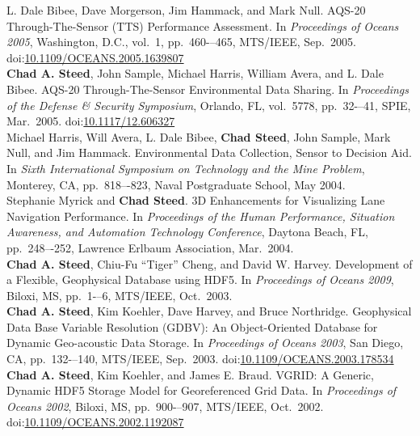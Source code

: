 \documentclass[11pt, letterpaper]{article}
\newcommand{\amper}{{\fontspec[Scale=.95]{Hoefler Text}\selectfont\itshape\&}}
\newcommand{\years}[1]{\marginnote{\scriptsize #1}}
\begin{document}
\begin{sloppypar}
L. Dale Bibee, Dave Morgerson, Jim Hammack, and Mark Null.  AQS-20
Through-The-Sensor (TTS) Performance Assessment.  In \emph{Proceedings of
Oceans 2005}, Washington, D.C., vol.\ 1, pp.\ 460-–465, MTS/IEEE, Sep.\ 2005.
doi:\href{http://dx.doi.org/10.1109/OCEANS.2005.1639807}
{10.1109/OCEANS.2005.1639807}\\
\years{2005}\textbf{Chad A. Steed}, John Sample, Michael Harris, William
Avera, and L. Dale Bibee. AQS-20 Through-The-Sensor Environmental Data
Sharing.  In \emph{Proceedings of the Defense \amper{} Security Symposium},
Orlando, FL, vol.\ 5778, pp.\ 32-–41, SPIE, Mar.\ 2005.
doi:\href{http://dx.doi.org/10.1117/12.606327}{10.1117/12.606327}\\
\years{2004}Michael Harris, Will Avera, L. Dale Bibee, \textbf{Chad Steed},
John Sample, Mark Null, and Jim Hammack.  Environmental Data Collection,
Sensor to Decision Aid.  In \emph{Sixth International Symposium on Technology
and the Mine Problem}, Monterey, CA, pp.\ 818–-823, Naval Postgraduate
School, May 2004.\\
\years{2004}Stephanie Myrick and \textbf{Chad Steed}.  3D Enhancements for
Visualizing Lane Navigation Performance.  In \emph{Proceedings of the Human
Performance, Situation Awareness, and Automation Technology Conference},
Daytona Beach, FL, pp.\ 248–-252, Lawrence Erlbaum Association, Mar.\ 2004.\\
\years{2003}\textbf{Chad A. Steed}, Chiu-Fu ``Tiger'' Cheng, and David W.
Harvey.  Development of a Flexible, Geophysical Database using HDF5.  In
\emph{Proceedings of Oceans 2009}, Biloxi, MS, pp.\ 1-–6, MTS/IEEE, Oct.\ 2003.\\
\years{2003}\textbf{Chad A. Steed}, Kim Koehler, Dave Harvey, and Bruce
Northridge.  Geophysical Data Base Variable Resolution (GDBV): An
Object-Oriented Database for Dynamic Geo-acoustic Data Storage.  In
\emph{Proceedings of Oceans 2003}, San Diego, CA, pp.\ 132-–140, MTS/IEEE,
Sep.\ 2003. doi:\href{http://dx.doi.org/10.1109/OCEANS.2003.178534}
{10.1109/OCEANS.2003.178534}\\
\years{2002}\textbf{Chad A. Steed}, Kim Koehler, and James E. Braud.
VGRID: A Generic, Dynamic HDF5 Storage Model for Georeferenced Grid Data.
In \emph{Proceedings of Oceans 2002}, Biloxi, MS, pp.\ 900-–907,
MTS/IEEE, Oct.\ 2002. doi:\href{http://dx.doi.org/10.1109/OCEANS.2002.1192087}
{10.1109/OCEANS.2002.1192087}
\end{sloppypar}
\end{document}
